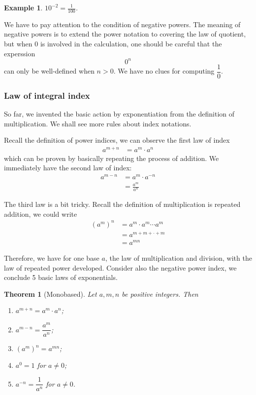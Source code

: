 \documentclass[12pt]{article}
\newtheorem*{theorem}{Theorem}
\newtheorem*{example}{Example}
\begin{document}
    \begin{example}
        $10^{-2}=\frac{1}{100}$.
    \end{example}

    We have to pay attention to the condition of negative powers. The meaning of negative powers is to extend the power notation to covering the law of quotient, but when 0 is involved in the calculation, one should be careful that the experssion $$0^n$$ can only be well-defined when $n>0$. We have no clues for computing $\dfrac{1}{0}$.

    \subsubsection*{Law of integral index}

    So far, we invented the basic action by exponentiation from the definition of multiplication. We shall see more rules about index notations.

    Recall the definition of power indices, we can observe the first law of index \begin{align*}
        a^{m+n}&=a^m \cdot a^n
    \end{align*} which can be proven by basically repeating the process of addition. We immediately have the second law of index:\begin{align*}
        a^{m-n}&=a^m\cdot a^{-n}\\
        &=\frac{a^m}{a^n}
    \end{align*}

    The third law is a bit tricky. Recall the definition of multiplication is repeated addition, we could write \begin{align*}
        (a^m)^n&=a^m\cdot a^m\cdots a^m\\
        &=a^{m+m+\cdot+m}\\
        &=a^{mn}
    \end{align*}

    Therefore, we have for one base $a$, the law of multiplication and division, with the law of repeated power developed. Consider also the negative power index, we conclude 5 basic laws of exponentials.

    \begin{theorem}[Monobased]
        Let $a, m, n$ be positive integers. Then\begin{enumerate}
            \item $a^{m+n}=a^m\cdot a^n$;
            \item $a^{m-n}=\dfrac{a^m}{a^n}$;
            \item $(a^m)^n=a^{mn}$;
            \item $a^0=1$ for $a\neq 0$;
            \item $a^{-n}=\dfrac{1}{a^n}$ for $a\neq 0$.
        \end{enumerate}
    \end{theorem}
\end{document}
